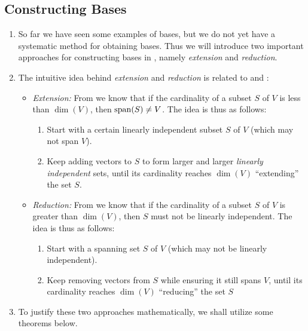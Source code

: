\subsection{Constructing Bases}
\label{subsect:construct-bases}
\begin{enumerate}
\item So far we have seen some examples of bases, but we do not yet have a
systematic method for obtaining bases. Thus we will introduce two important
approaches for constructing bases in , namely
\emph{extension} and \emph{reduction}.

\item The intuitive idea behind \emph{extension} and \emph{reduction} is
related to  and
:
\begin{itemize}
\item \emph{Extension:} From  we
know that if the cardinality of a subset \(S\) of \(V\) is less than
\(\dim(V)\), then \(\operatorname{span}(S)\ne V\). The idea is thus as follows:
\begin{enumerate}
\item Start with a certain linearly independent subset \(S\) of \(V\) (which
may not span \(V\)).
\item  Keep adding vectors to \(S\) to form larger and larger \emph{linearly
independent} sets, until its cardinality reaches \(\dim(V)\)
 ``extending'' the set \(S\).
\end{enumerate}
\item \emph{Reduction:} From  we
know that if the cardinality of a subset \(S\) of \(V\) is greater than
\(\dim(V)\), then \(S\) must not be linearly independent. The idea is thus as follows:
\begin{enumerate}
\item Start with a spanning set \(S\) of \(V\) (which may not be linearly
independent).
\item Keep removing vectors from \(S\) while ensuring it still spans \(V\),
until its cardinality reaches \(\dim(V)\)  ``reducing'' the
set \(S\)
\end{enumerate}
\end{itemize}

\item To justify these two approaches mathematically, we shall utilize some
theorems below.


\end{enumerate}
